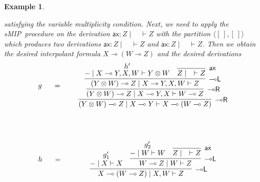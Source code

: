 \documentclass[sn-mathphys-num]{sn-jnl}%
\newcommand{\vd}{\vdash}
\newcommand{\tr}{\otimes\mathsf{R}}
\newcommand{\pass}{\mathsf{pass}}
\newcommand{\ax}{\mathsf{ax}}
\newcommand{\ot}{\otimes}
\newcommand{\lolli}{\multimap}
\newcommand{\lleft}{{\lolli}\mathsf{L}}
\newcommand{\lright}{{\lolli}\mathsf{R}}
\newcommand{\sMIP}{\textsf{sMIP}}
\theoremstyle{thmstyleone}%
\theoremstyle{thmstyletwo}%
\newtheorem{example}[theorem]{Example}%
\theoremstyle{thmstylethree}%
\begin{document}
\begin{example}
\begin{itemize}
  \end{itemize}
  satisfying the variable multiplicity condition.
  Next, we need to apply the \sMIP~procedure on the derivation $\ax : Z \mid \quad \vd Z$ with the partition $\langle [\ ] , [\ ] \rangle$ which produces two derivations $\ax : Z \mid \quad \vd Z$ and $\ax : Z \mid \quad \vd Z$.
  Then we obtain the desired interpolant formula $X \lolli (W \lolli Z)$ and the desired derivations 
  \begin{displaymath}
    \begin{array}{lc}
      \begin{array}{c}
        g
      \end{array}
      \quad
      =&
      \quad
      \begin{array}{c}
        \infer[\lright]{(Y \ot W) \lolli Z \mid X \lolli Y \vd X \lolli (W \lolli Z)}{
        \infer[\lright]{(Y \ot W) \lolli Z \mid X \lolli Y , X\vd W \lolli Z}{
        \infer[\lleft]{(Y \ot W) \lolli Z \mid X \lolli Y , X , W \vd Z}{
        \deduce{{-} \mid X \lolli Y , X , W\vd Y \ot W}{h'}
        &
        \infer[\ax]{Z \mid \quad \vd Z}{}
        }
        }
        }
      \end{array}
      \\[2.5cm]
      \begin{array}{c}
        h
      \end{array}
      \quad
      =&
      \quad
      \begin{array}{c}
        \infer[\lleft]{X \lolli (W \lolli Z) \mid X, W \vd Z}{
        \deduce{{-} \mid X \vd X}{g'_1}
        &
        \infer[\lleft]{W \lolli Z \mid W \vd Z}{
        \deduce{{-} \mid W \vd W}{g'_2}
        &
        \infer[\ax]{Z \mid \quad \vd Z}{}
        }
        }
      \end{array}
    \end{array}
  \end{displaymath}

\end{example}
\end{document}
